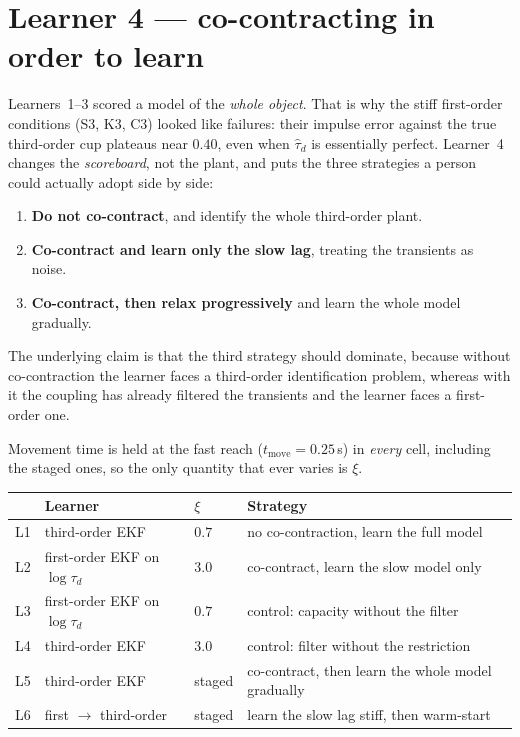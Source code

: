 \documentclass[11pt,a4paper]{article}
\begin{document}
\section{Learner 4 --- co-contracting in order to learn}
\label{sec:learner4}

Learners~1--3 scored a model of the \emph{whole object}. That is why the stiff
first-order conditions (S3, K3, C3) looked like failures: their impulse error
against the true third-order cup plateaus near $0.40$, even when
$\hat\tau_d$ is essentially perfect. Learner~4 changes the
\emph{scoreboard}, not the plant, and puts the three strategies a person
could actually adopt side by side:

\begin{enumerate}[nosep]
\item \textbf{Do not co-contract}, and identify the whole third-order plant.
\item \textbf{Co-contract and learn only the slow lag}, treating the
  transients as noise.
\item \textbf{Co-contract, then relax progressively} and learn the whole
  model gradually.
\end{enumerate}

The underlying claim is that the third strategy should dominate, because
without co-contraction the learner faces a third-order identification
problem, whereas with it the coupling has already filtered the transients
and the learner faces a first-order one.

Movement time is held at the fast reach ($t_{\mathrm{move}}=0.25$\,s) in
\emph{every} cell, including the staged ones, so the only quantity that ever
varies is $\xi$.

\begin{center}
\small
\begin{tabular}{@{}llll@{}}
\toprule
 & Learner & $\xi$ & Strategy \\
\midrule
L1 & third-order EKF & $0.7$ & no co-contraction, learn the full model \\
L2 & first-order EKF on $\log\tau_d$ & $3.0$ & co-contract, learn the slow model only \\
L3 & first-order EKF on $\log\tau_d$ & $0.7$ & control: capacity without the filter \\
L4 & third-order EKF & $3.0$ & control: filter without the restriction \\
L5 & third-order EKF & staged & co-contract, then learn the whole model gradually \\
L6 & first $\to$ third-order & staged & learn the slow lag stiff, then warm-start \\
\bottomrule
\end{tabular}
\end{center}
\end{document}
